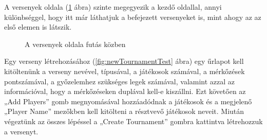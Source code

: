 A versenyek oldala (\ref{fig:tournamentsTest} ábra) szinte megegyezik a kezdő oldallal, annyi különbséggel, hogy itt már láthatjuk a befejezett versenyeket is, mint ahogy az az első elemen is látszik.

\begin{figure}[h]
\centering
{}
\caption{A versenyek oldala futás közben}
\label{fig:tournamentsTest}
\end{figure}

Egy verseny létrehozásához (\ref{fig:newTournamentTest} ábra) egy űrlapot kell kitöltenünk a verseny nevével, típusával, a játékosok számával, a mérkőzések pontszámával, a győzelemhez szükséges legek számával, valamint azzal az információval, hogy a mérkőzéseken duplával kell-e kiszállni. Ezt követően az „Add Players” gomb megnyomásával hozzáadódnak a játékosok és a megjelenő „Player Name” mezőkben kell kitölteni a résztvevő játékosok neveit. Miután végeztünk az összes lépéssel a „Create Tournament” gombra kattintva létrehozzuk a versenyt.

